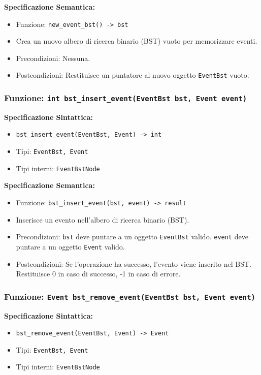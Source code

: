 \documentclass[11pt]{scrartcl} %
\begin{document}
\textbf{Specificazione Semantica:}
\begin{itemize}
\item Funzione: \texttt{new\_event\_bst() -> bst}
\item Crea un nuovo albero di ricerca binario (BST) vuoto per memorizzare eventi.
\item Precondizioni: Nessuna.
\item Postcondizioni: Restituisce un puntatore al nuovo oggetto \texttt{EventBst} vuoto.
\end{itemize}

\subsubsection{Funzione: \texttt{int bst\_insert\_event(EventBst bst, Event event)}}

\textbf{Specificazione Sintattica:}
\begin{itemize}
\item \texttt{bst\_insert\_event(EventBst, Event) -> int}
\item Tipi: \texttt{EventBst, Event}
\item Tipi interni: \texttt{EventBstNode}
\end{itemize}

\textbf{Specificazione Semantica:}
\begin{itemize}
\item Funzione: \texttt{bst\_insert\_event(bst, event) -> result}
\item Inserisce un evento nell'albero di ricerca binario (BST).
\item Precondizioni: \texttt{bst} deve puntare a un oggetto \texttt{EventBst} valido. \texttt{event} deve puntare a un oggetto \texttt{Event} valido.
\item Postcondizioni: Se l'operazione ha successo, l'evento viene inserito nel BST. Restituisce 0 in caso di successo, -1 in caso di errore.
\end{itemize}

\subsubsection{Funzione: \texttt{Event bst\_remove\_event(EventBst bst, Event event)}}

\textbf{Specificazione Sintattica:}
\begin{itemize}
\item \texttt{bst\_remove\_event(EventBst, Event) -> Event}
\item Tipi: \texttt{EventBst, Event}
\item Tipi interni: \texttt{EventBstNode}
\end{itemize}
\end{document}
